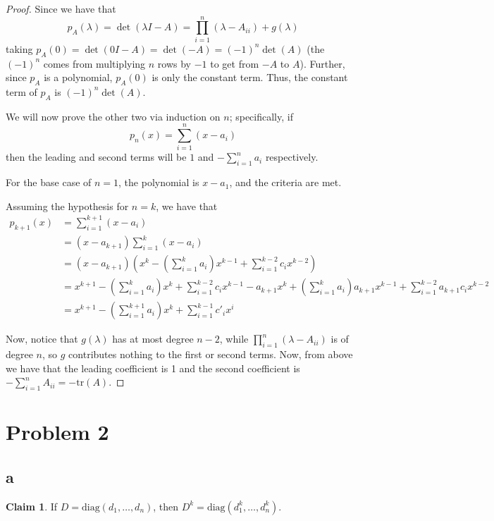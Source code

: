 \documentclass[12pt,letterpaper]{article}
\theoremstyle{definition}
\newtheorem*{claim}{Claim}
\newcommand{\tr}{\mathrm{tr}}
\begin{document}
\begin{proof}
  Since we have that 
  \[
    p_A(\lambda) = \det(\lambda I - A) = \prod_{i=1}^{n}(\lambda - A_{ii}) + g(\lambda)
  \]
  taking $p_A(0) = \det(0I - A) = \det(-A) = (-1)^n\det(A)$ (the $(-1)^n$ comes
  from multiplying $n$ rows by $-1$ to get from $-A$ to $A$). Further, since
  $p_A$ is a polynomial, $p_A(0)$ is only the constant term. Thus, the constant
  term of $p_A$ is $(-1)^n\det(A)$.

  We will now prove the other two via induction on $n$; specifically, if
  \[
    p_n(x) = \sum_{i=1}^{n}(x - a_i)
  \]
  then the leading and second terms will be $1$ and $-\sum_{i=1}^na_i$ respectively.

  For the base case of $n = 1$, the polynomial is $x - a_1$, and the criteria
  are met. 

  Assuming the hypothesis for $n = k$, we have that
  \begin{align*}
    p_{k+1}(x) &= \sum_{i=1}^{k+1}(x - a_i) \\
               &= (x - a_{k+1})\sum_{i=1}^{k}(x - a_i) \\
               &= (x - a_{k+1})(x^k - (\sum_{i=1}^ka_i)x^{k-1} + \sum_{i=1}^{k-2}c_ix^{k-2})  \\
               &= x^{k+1} - (\sum_{i=1}^ka_i)x^{k} + \sum_{i=1}^{k-2}c_ix^{k-1} - a_{k+1}x^k + (\sum_{i=1}^ka_i)a_{k+1}x^{k-1} + \sum_{i=1}^{k-2}a_{k+1}c_ix^{k-2} \\
               &= x^{k+1} - (\sum_{i=1}^{k+1}a_i)x^k + \sum_{i=1}^{k-1}c'_ix^i
  \end{align*}

  Now, notice that $g(\lambda)$ has at most degree $n - 2$, while
  $\prod_{i=1}^n(\lambda - A_{ii})$ is of degree $n$, so $g$
  contributes nothing to the first or second terms. Now, from above we have that
  the leading coefficient is 1 and the second coefficient is
  $-\sum_{i=1}^nA_{ii} = -\tr(A)$.
\end{proof}

\section*{Problem 2}

\subsection*{a}

\begin{claim}
  If $D = \text{diag}(d_1, \dots, d_n)$, then $D^k = \text{diag}(d_1^k, \dots, d_n^k)$.
\end{claim}
\end{document}
